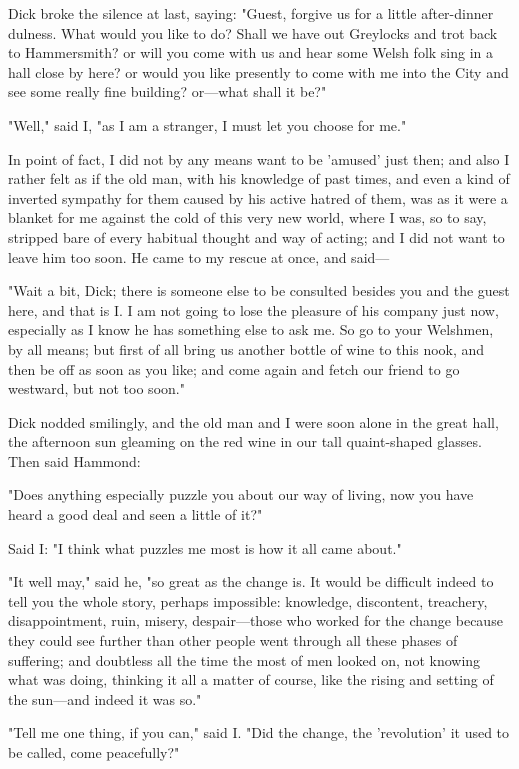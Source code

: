 Dick broke the silence at last, saying: "Guest, forgive us for a little
after-dinner dulness. What would you like to do? Shall we have out
Greylocks and trot back to Hammersmith? or will you come with us and
hear some Welsh folk sing in a hall close by here? or would you like
presently to come with me into the City and see some really fine
building? or---what shall it be?"

"Well," said I, "as I am a stranger, I must let you choose for me."

In point of fact, I did not by any means want to be 'amused' just then;
and also I rather felt as if the old man, with his knowledge of past
times, and even a kind of inverted sympathy for them caused by his
active hatred of them, was as it were a blanket for me against the cold
of this very new world, where I was, so to say, stripped bare of every
habitual thought and way of acting; and I did not want to leave him too
soon. He came to my rescue at once, and said---

"Wait a bit, Dick; there is someone else to be consulted besides you and
the guest here, and that is I. I am not going to lose the pleasure of
his company just now, especially as I know he has something else to ask
me. So go to your Welshmen, by all means; but first of all bring us
another bottle of wine to this nook, and then be off as soon as you
like; and come again and fetch our friend to go westward, but not too
soon."

Dick nodded smilingly, and the old man and I were soon alone in the
great hall, the afternoon sun gleaming on the red wine in our tall
quaint-shaped glasses. Then said Hammond:

"Does anything especially puzzle you about our way of living, now you
have heard a good deal and seen a little of it?"

Said I: "I think what puzzles me most is how it all came about."

"It well may," said he, "so great as the change is. It would be
difficult indeed to tell you the whole story, perhaps impossible:
knowledge, discontent, treachery, disappointment, ruin, misery,
despair---those who worked for the change because they could see further
than other people went through all these phases of suffering; and
doubtless all the time the most of men looked on, not knowing what was
doing, thinking it all a matter of course, like the rising and setting
of the sun---and indeed it was so."

"Tell me one thing, if you can," said I. "Did the change, the
'revolution' it used to be called, come peacefully?"

